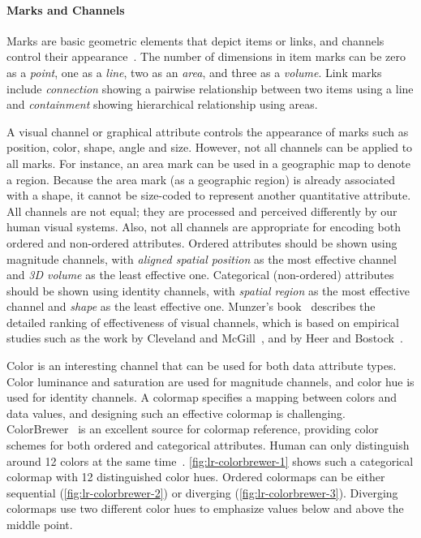 \paragraph{Marks and Channels}
Marks are basic geometric elements that depict items or links, and channels control their appearance~\cite{Munzner2014}. The number of dimensions in item marks can be zero as a \emph{point}, one as a \emph{line}, two as an \emph{area}, and three as a \emph{volume}. Link marks include \emph{connection} showing a pairwise relationship between two items using a line and \emph{containment} showing hierarchical relationship using areas.



A visual channel or graphical attribute controls the appearance of marks such as position, color, shape, angle and size. However, not all channels can be applied to all marks. For instance, an area mark can be used in a geographic map to denote a region. Because the area mark (as a geographic region) is already associated with a shape, it cannot be size-coded to represent another quantitative attribute.
All channels are not equal; they are processed and perceived differently by our human visual systems. Also, not all channels are appropriate for encoding both ordered and non-ordered attributes. Ordered attributes should be shown using magnitude channels, with \emph{aligned spatial position} as the most effective channel and \emph{3D volume} as the least effective one. Categorical (non-ordered) attributes should be shown using identity channels, with \emph{spatial region} as the most effective channel and \emph{shape} as the least effective one. Munzer's book~\cite{Munzner2014} describes the detailed ranking of effectiveness of visual channels, which is based on empirical studies such as the work by Cleveland and McGill~\cite{Cleveland1985}, and by Heer and Bostock~\cite{Heer2010a}.

Color is an interesting channel that can be used for both data attribute types. Color luminance and saturation are used for magnitude channels, and color hue is used for identity channels. A colormap specifies a mapping between colors and data values, and designing such an effective colormap is challenging. ColorBrewer~\cite{Harrower2003} is an excellent source for colormap reference, providing color schemes for both ordered and categorical attributes. Human can only distinguish around 12 colors at the same time~\cite{Munzner2014}. \autoref{fig:lr-colorbrewer-1} shows such a categorical colormap with 12 distinguished color hues. Ordered colormaps can be either sequential (\autoref{fig:lr-colorbrewer-2}) or diverging (\autoref{fig:lr-colorbrewer-3}). Diverging colormaps use two different color hues to emphasize values below and above the middle point.

